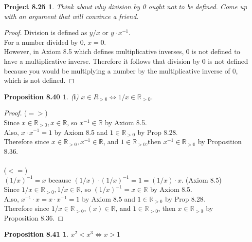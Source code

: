 \documentclass[12pt]{amsart}
\newcommand{\R}{\mathbb{R}}
\begin{document}
\newtheorem*{prop8.25}{Project 8.25}
\begin{prop8.25}
	Think about why division by 0 ought not to be defined. Come up with an argument that will convince a friend.
\end{prop8.25}

\begin{proof}
	Division is defined as $y/x$ or $y \cdot x^{-1}$.\\
	For a number divided by 0, $x=0$. \\
	However, in Axiom 8.5 which defines multiplicative inverses, $0$ is not defined to have a multiplicative inverse. Therefore it follows that division by 0 is not defined because you would be multiplying a number by the multiplicative inverse of 0, which is not defined.
\end{proof}

\newtheorem*{prop8.40}{Proposition 8.40}
\begin{prop8.40}
	\item[($\textbf{i}$)] $x \in R_{>0} \iff 1/x \in \R_{>0}$.
\end{prop8.40}

\begin{proof}
	($=>$)\\
	Since $x \in \R_{>0}, x\in \R$, so $x^{-1} \in \R$ by Axiom 8.5. \\
	Also, $x \cdot x^{-1} = 1$ by Axiom 8.5 and $1 \in \R_{>0}$ by Prop 8.28. \\
	Therefore since $x \in \R_{>0}, x^{-1} \in \R$, and $1 \in \R_{>0}$,then $x^{-1} \in \R_{>0}$ by Proposition 8.36. \\\\
	($<=$) \\
	$(1/x)^{-1} = x$ because $(1/x)\cdot(1/x)^{-1} = 1 = (1/x)\cdot x$. (Axiom 8.5)\\
	Since $1/x \in \R_{>0}, 1/x\in \R$, so $(1/x)^{-1} = x \in \R$ by Axiom 8.5. \\
	Also, $x^{-1}\cdot x = x \cdot x^{-1} = 1$ by Axiom 8.5 and $1 \in \R_{>0}$ by Prop 8.28. \\
	Therefore since $1/x \in \R_{>0}, (x) \in \R$, and $1 \in \R_{>0}$, then $x \in \R_{>0}$ by Proposition 8.36.
\end{proof}

\newtheorem*{prop8.41}{Proposition 8.41}
\begin{prop8.41}
	$x^2 < x^3 \iff x > 1$
\end{prop8.41}
\end{document}
